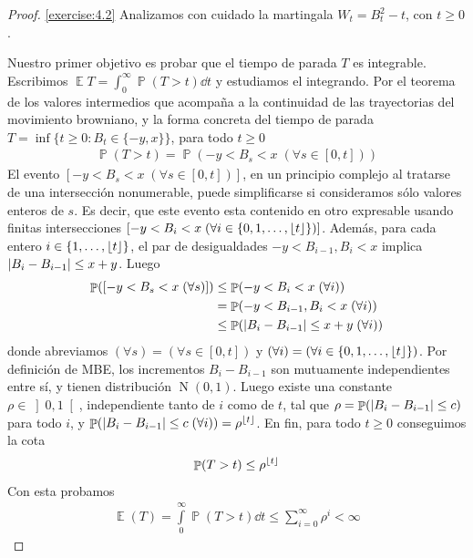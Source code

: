 \documentclass{article}
\DeclarePairedDelimiter{\floor}{\lfloor}{\rfloor}
\DeclareMathOperator{\prob}{\mathbb{P}}
\DeclareMathOperator{\Expectation}{\mathbb{E}}
\DeclareMathOperator{\normal}{N}
\newcommand{\brownian}{B}
\newcommand{\wiener}{W}
\theoremstyle{definition}
\begin{document}
\begin{proof} \ref{exercise:4.2}
Analizamos con cuidado la martingala \(\wiener_t = \brownian_t^2 - t\), con \(t \geq 0\).

Nuestro primer objetivo es probar que el tiempo de parada \(T\) es integrable.
Escribimos \(\Expectation T = \int_0^{\infty} \prob(T > t) \dd t\) y estudiamos el integrando.
Por el teorema de los valores intermedios que acompaña a la continuidad de las trayectorias del movimiento browniano, y la forma concreta del tiempo de parada \(T = \inf \{t \geq 0 : B_t \in \{-y, x\}\}\), para todo \(t \geq 0\)
\begin{align}
	\prob(T > t)
	=
	\prob(- y < B_s < x \;(\forall s \in [0, t]))
\end{align}
El evento \(\left[ - y < B_s < x \;(\forall s \in [0, t]) \right]\), en un principio complejo al tratarse de una intersección nonumerable, puede simplificarse si consideramos sólo valores enteros de \(s\).
Es decir, que este evento esta contenido en otro expresable usando finitas intersecciones \(\left[ - y < B_i < x \;(\forall i \in \{0, 1, \dots, \floor{t}\}) \right]\).
Además, para cada entero \(i \in \{1, \dots, \floor{t}\}\), el par de desigualdades \(- y < B_{i - 1}, B_i < x\) implica \(\abs{B_i - B_{i - 1}} \leq x + y\).
Luego
\begin{align}
	\prob([- y < B_s < x \;(\forall s)])
	&\leq
	\prob(- y < B_i < x \;(\forall i))
	\\
	&=
	\prob(- y < B_{i - 1}, B_i < x \;(\forall i))
	\\
	&\leq
	\prob(\abs{B_i - B_{i - 1}} \leq x + y \;(\forall i))
\end{align}
donde abreviamos \((\forall s) = (\forall s \in [0, t])\) y \((\forall i) = (\forall i \in \{0, 1, \dots, \floor{t}\})\).
Por definición de MBE, los incrementos \(B_i - B_{i - 1}\) son mutuamente independientes entre sí, y tienen distribución \(\normal(0, 1)\).
Luego existe una constante \(\rho \in \left]0, 1 \right[\), independiente tanto de \(i\) como de \(t\), tal que \(\rho = \prob(\abs{B_i - B_{i - 1}} \leq c)\) para todo \(i\), y \(\prob(\abs{B_i - B_{i - 1}} \leq c \;(\forall i)) =	\rho^{\floor{t}}\).
En fin, para todo \(t \geq 0\) conseguimos la cota
\begin{align}
	\prob(T > t) \leq \rho^{\floor{t}}
\end{align}
Con esta probamos
\begin{align}
	\Expectation(T)
	=
	\int\limits_0^{\infty} \prob(T > t) \dd t
	\leq
	\sum_{i = 0}^{\infty} \rho^i
	<
	\infty
\end{align}
	

\end{proof}
\end{document}
